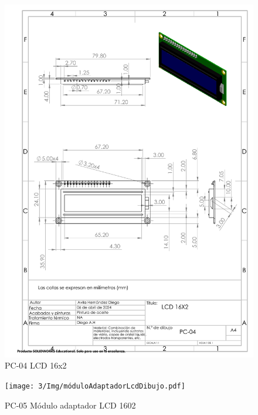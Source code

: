     \begin{figure}[H]
        \centering
        \includegraphics[scale=0.4]{3/Img/lcdDibujo.pdf}
        \caption{PC-04 LCD 16x2} 
        \label{fig:lcdDibujo}
    \end{figure}
    \begin{figure}[H]
        \centering
        \texttt{[image: 3/Img/móduloAdaptadorLcdDibujo.pdf]}
        \caption{PC-05 Módulo adaptador LCD 1602} 
        \label{fig:móduloAdaptadorLcdDibujo}
    \end{figure}
